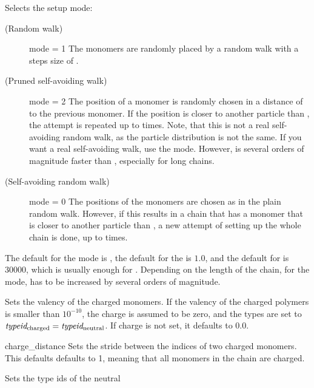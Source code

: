 \begin{arguments}
\item[\opt{mode \alt{RW  \asep  PSAW  \asep  SAW} \opt{\var{shield}
      \opt{\var{try_\mathrm{max}}}}}]
  Selects the setup mode:
  \begin{description}
  \item[ (Random walk)] mode = 1 The monomers are
    randomly placed by a random walk with a steps size of
    .
  \item[ (Pruned self-avoiding walk)] mode = 2 The position of a
    monomer is randomly chosen in a distance of  to
    the previous monomer. If the position is closer to another
    particle than , the attempt is repeated up to
     times. Note, that this is not a real
    self-avoiding random walk, as the particle distribution is not the
    same. If you want a real self-avoiding walk, use the 
    mode.  However,  is several orders of magnitude
    faster than , especially for long chains.
  \item[ (Self-avoiding random walk)] mode = 0 The positions of
    the monomers are chosen as in the plain random walk. However, if
    this results in a chain that has a monomer that is closer to
    another particle than , a new attempt of setting up
    the whole chain is done, up to  times.
  \end{description}
  The default for the mode is , the default for the
   is $1.0$, and the default for  is
  $30000$, which is usually enough for . Depending on
  the length of the chain, for the  mode,
   has to be increased by several orders of
  magnitude.
\item[\opt{charge \var{valency}}] Sets the valency of the charged
  monomers.  If the valency of the charged polymers  is
  smaller than $10^{-10}$, the charge is assumed to be zero, and the
  types are set to $\mathrm{\mathit{typeid_\mathrm{charged}}} =
  \mathrm{\mathit{typeid_\mathrm{neutral}}}$. If charge is not set, it defaults to
  0.0.
\item[\opt{distance \var{d_\mathrm{charged}}}] charge\_distance Sets the stride
  between the indices of two charged monomers. This defaults defaults
  to 1, meaning that all monomers in the chain are charged.
\item[\opt{types \var{typeid_\mathrm{neutral}} type\_poly\_neutral
		type\_poly\_charged
    \var{typeid_\mathrm{charged}}}] Sets the type ids of the neutral

\end{arguments}
